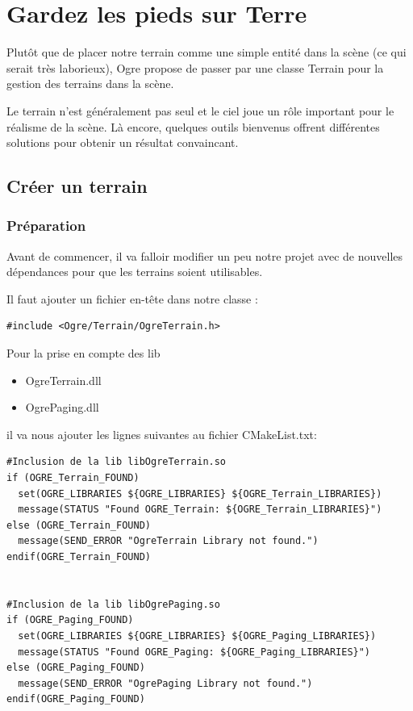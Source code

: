 
\chapter{Gardez les pieds sur Terre}
Plut\^ot que de placer notre terrain comme une simple entit\'e dans la sc\`ene (ce qui serait tr\`es laborieux), Ogre propose de passer par une classe Terrain pour la gestion des terrains dans la sc\`ene.

Le terrain n'est g\'en\'eralement pas seul et le ciel joue un r\^ole important pour le r\'ealisme de la sc\`ene. L\`a encore, quelques outils bienvenus offrent diff\'erentes solutions pour obtenir un r\'esultat convaincant.



\section{Cr\'eer un terrain}


\subsection{Pr\'eparation}

Avant de commencer, il va falloir modifier un peu notre projet avec de nouvelles d\'ependances pour que les terrains soient utilisables.

Il faut ajouter un fichier en-t\^ete dans notre classe :

\begin{lstlisting}[caption={Ajout du fichier d'ent\^ete pour la gestion des terrains}]
#include <Ogre/Terrain/OgreTerrain.h>
\end{lstlisting}

Pour la prise en compte des lib
\begin{itemize}
\item OgreTerrain.dll
\item OgrePaging.dll
\end{itemize}

il va nous ajouter les lignes suivantes au fichier CMakeList.txt:

\begin{lstlisting}[caption={Modification de CMakeLists.txt pour l'inclusion des lib Terrain et Paging}]
#Inclusion de la lib libOgreTerrain.so
if (OGRE_Terrain_FOUND)
  set(OGRE_LIBRARIES ${OGRE_LIBRARIES} ${OGRE_Terrain_LIBRARIES})
  message(STATUS "Found OGRE_Terrain: ${OGRE_Terrain_LIBRARIES}")
else (OGRE_Terrain_FOUND)
  message(SEND_ERROR "OgreTerrain Library not found.")
endif(OGRE_Terrain_FOUND)


#Inclusion de la lib libOgrePaging.so
if (OGRE_Paging_FOUND)
  set(OGRE_LIBRARIES ${OGRE_LIBRARIES} ${OGRE_Paging_LIBRARIES})
  message(STATUS "Found OGRE_Paging: ${OGRE_Paging_LIBRARIES}")
else (OGRE_Paging_FOUND)
  message(SEND_ERROR "OgrePaging Library not found.")
endif(OGRE_Paging_FOUND)
\end{lstlisting}

